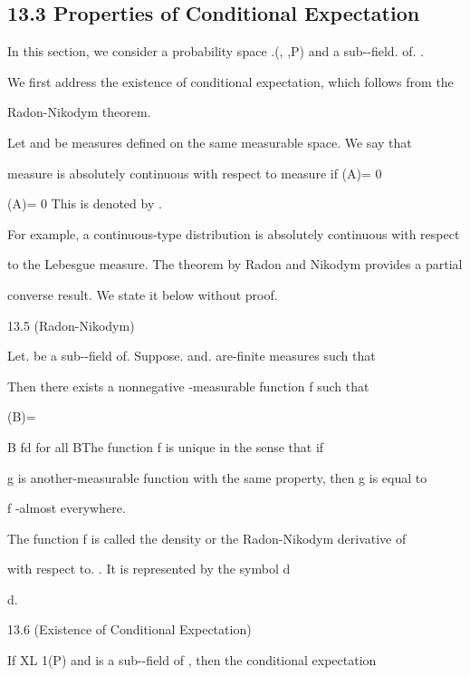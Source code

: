 \subsection*{13.3 Properties of Conditional Expectation}

In this section, we consider a probability space .(\Omega, ,P) and a sub-\sigma-field. of. .

We first address the existence of conditional expectation, which follows from the

Radon-Nikodym theorem.

Let \mu and \nu be measures defined on the same measurable space. We say that

measure \nu is absolutely continuous with respect to measure \mu if \mu(A)= 0

\nu(A)= 0 This is denoted by \nu\ll \mu .

For example, a continuous-type distribution is absolutely continuous with respect

to the Lebesgue measure. The theorem by Radon and Nikodym provides a partial

converse result. We state it below without proof.

\begin{thmbox}{13.5 (Radon-Nikodym)}
\end{thmbox}

Let. be a sub-\sigma-field of. Suppose. \nu and. \mu are\sigma-finite measures such that

\nu\ll \mu Then there exists a nonnegative -measurable function f such that

\nu(B)=

\int

B fd \mu for all B\in {}The function f is unique in the sense that if

g is another-measurable function with the same property, then g is equal to

f \mu-almost everywhere.

The function f is called the density or the Radon-Nikodym derivative of

\nu with respect to. \mu. It is represented by the symbol d\nu

d\mu .

\begin{thmbox}{13.6 (Existence of Conditional Expectation)}
\end{thmbox}

If X\in L 1(P) and is a sub-\sigma-field of , then the conditional expectation

